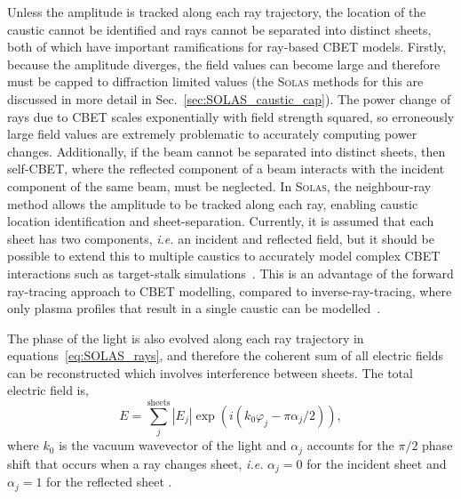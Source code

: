 Unless the amplitude is tracked along each ray trajectory, the location of the caustic cannot be identified and rays cannot be separated into distinct sheets, both of which have important ramifications for ray-based \ac{CBET} models.
Firstly, because the amplitude diverges, the field values can become large and therefore must be capped to diffraction limited values (the \textsc{Solas} methods for this are discussed in more detail in Sec.~\ref{sec:SOLAS_caustic_cap}).
The power change of rays due to \ac{CBET} scales exponentially with field strength squared, so erroneously large field values are extremely problematic to accurately computing power changes.
Additionally, if the beam cannot be separated into distinct sheets, then self-\ac{CBET}, where the reflected component of a beam interacts with the incident component of the same beam, must be neglected.
In \textsc{Solas}, the neighbour-ray method allows the amplitude to be tracked along each ray, enabling caustic location identification and sheet-separation.
Currently, it is assumed that each sheet has two components, \textit{i.e.} an incident and reflected field, but it should be possible to extend this to multiple caustics to accurately model complex \ac{CBET} interactions such as target-stalk simulations~\cite{igumenshchev_effects_2009,igumenshchev_three-dimensional_2016,gatu_johnson_impact_2020}.
This is an advantage of the forward ray-tracing approach to \ac{CBET} modelling, compared to inverse-ray-tracing, where only plasma profiles that result in a single caustic can be modelled~\cite{colaitis_inverse_2021}.

The phase of the light is also evolved along each ray trajectory in equations~\ref{eq:SOLAS_rays}, and therefore the coherent sum of all electric fields can be reconstructed which involves interference between sheets.
The total electric field is,
\begin{equation}%
    \label{eq:SOLAS_Ecoherent}
    E = \sum_{j}^{\text{sheets}} |E_j|\exp{\left( i(k_0\varphi_j-\pi\alpha_j/2) \right)},
\end{equation}
where $k_0$ is the vacuum wavevector of the light and $\alpha_j$ accounts for the $\pi/2$ phase shift that occurs when a ray changes sheet, \textit{i.e.} $\alpha_j=0$ for the incident sheet and $\alpha_j=1$ for the reflected sheet \cite{follett_validation_2022}.

